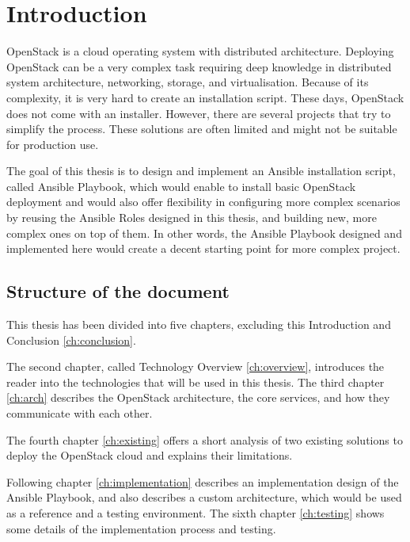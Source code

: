 \chapter{Introduction}
OpenStack is a cloud operating system with distributed architecture. Deploying OpenStack can be a very complex task requiring deep knowledge in distributed system architecture, networking, storage, and virtualisation. Because of its complexity, it is very hard to create an installation script. These days, OpenStack does not come with an installer. However, there are several projects that try to simplify the process. These solutions are often limited and might not be suitable for production use.

The goal of this thesis is to design and implement an Ansible installation script, called Ansible Playbook, which would enable to install basic OpenStack deployment and would also offer flexibility in configuring more complex scenarios by reusing the Ansible Roles designed in this thesis, and building new, more complex ones on top of them. In other words, the Ansible Playbook designed and implemented here would create a decent starting point for more complex project.

\section{Structure of the document}

This thesis has been divided into five chapters, excluding this Introduction  and Conclusion \ref{ch:conclusion}.

The second chapter, called Technology Overview \ref{ch:overview}, introduces the reader into the technologies that will be used in this thesis. The third chapter \ref{ch:arch} describes the OpenStack architecture, the core services, and how they communicate with each other.

The fourth chapter \ref{ch:existing} offers a short analysis of two existing solutions to deploy the OpenStack cloud and explains their limitations.

Following chapter \ref{ch:implementation} describes an implementation design of the Ansible Playbook, and also describes a custom architecture, which would be used as a reference and a testing environment. The sixth chapter \ref{ch:testing} shows some details of the implementation process and testing.
